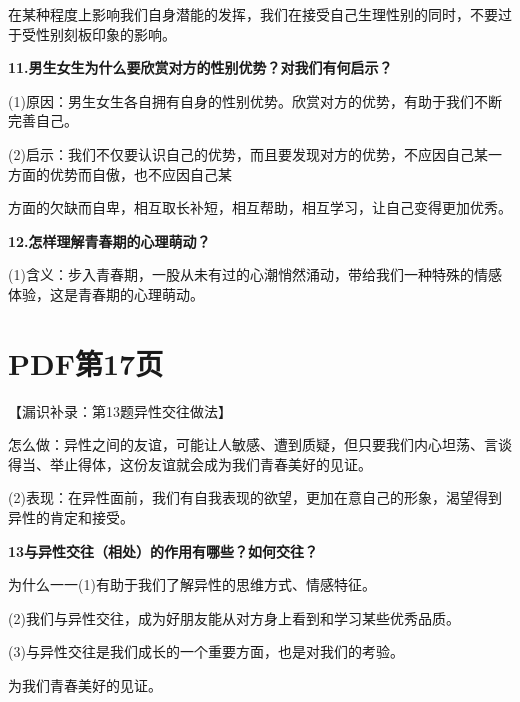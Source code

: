 \documentclass[lang=cn,11pt]{elegantbook}
\begin{document}
在某种程度上影响我们自身潜能的发挥，我们在接受自己生理性别的同时，不要过于受性别刻板印象的影响。\par

\textbf{11.男生女生为什么要欣赏对方的性别优势？对我们有何启示？}\par

(1)原因：男生女生各自拥有自身的性别优势。欣赏对方的优势，有助于我们不断完善自己。\par

(2)启示：我们不仅要认识自己的优势，而且要发现对方的优势，不应因自己某一方面的优势而自傲，也不应因自己某\par

方面的欠缺而自卑，相互取长补短，相互帮助，相互学习，让自己变得更加优秀。\par

\textbf{12.怎样理解青春期的心理萌动？}\par

(1)含义：步入青春期，一股从未有过的心潮悄然涌动，带给我们一种特殊的情感体验，这是青春期的心理萌动。\par


\section*{PDF第17页}

【漏识补录：第13题异性交往做法】\par

怎么做：异性之间的友谊，可能让人敏感、遭到质疑，但只要我们内心坦荡、言谈得当、举止得体，这份友谊就会成为我们青春美好的见证。\par

(2)表现：在异性面前，我们有自我表现的欲望，更加在意自己的形象，渴望得到异性的肯定和接受。\par

\textbf{13与异性交往（相处）的作用有哪些？如何交往？}\par

为什么一一(1)有助于我们了解异性的思维方式、情感特征。\par

(2)我们与异性交往，成为好朋友能从对方身上看到和学习某些优秀品质。\par

(3)与异性交往是我们成长的一个重要方面，也是对我们的考验。\par

为我们青春美好的见证。\par
\end{document}
